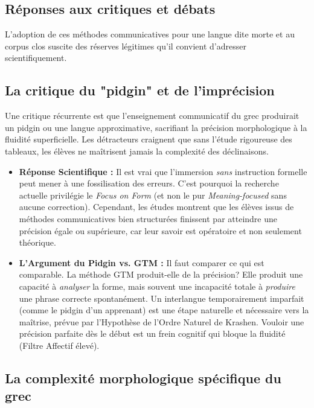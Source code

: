 \subsection{Réponses aux critiques et débats}

L'adoption de ces méthodes communicatives pour une langue dite \og morte\fg{} et au corpus clos
suscite des réserves légitimes qu'il convient d'adresser scientifiquement.



\subsection{La critique du "pidgin" et de l'imprécision}

Une critique récurrente est que l'enseignement communicatif du grec produirait un \og pidgin\fg{} ou
une langue approximative, sacrifiant la précision morphologique à la fluidité superficielle. Les
détracteurs craignent que sans l'étude rigoureuse des tableaux, les élèves ne maîtrisent jamais la
complexité des déclinaisons.\cite{II-3-3-ref66}

\begin{itemize}\item \textbf{Réponse Scientifique :} Il est vrai que l'immersion \textit{sans} instruction formelle peut mener à une fossilisation des erreurs. C'est pourquoi la recherche actuelle privilégie le \textit{Focus on Form} (et non le pur \textit{Meaning-focused} sans aucune correction). Cependant, les études montrent que les élèves issus de méthodes communicatives bien structurées finissent par atteindre une précision égale ou supérieure, car leur savoir est opératoire et non seulement théorique.\cite{II-3-3-ref69}\item \textbf{L'Argument du \og Pidgin\fg{} vs. GTM :} Il faut comparer ce qui est comparable. La méthode GTM produit-elle de la précision? Elle produit une capacité à \textit{analyser} la forme, mais souvent une incapacité totale à \textit{produire} une phrase correcte spontanément. Un \og interlangue\fg{} temporairement imparfait (comme le pidgin d'un apprenant) est une étape naturelle et nécessaire vers la maîtrise, prévue par l'Hypothèse de l'Ordre Naturel de Krashen. Vouloir une précision parfaite dès le début est un frein cognitif qui bloque la fluidité (Filtre Affectif élevé).\cite{II-3-3-ref70}\end{itemize}

\subsection{La complexité morphologique spécifique du grec}

